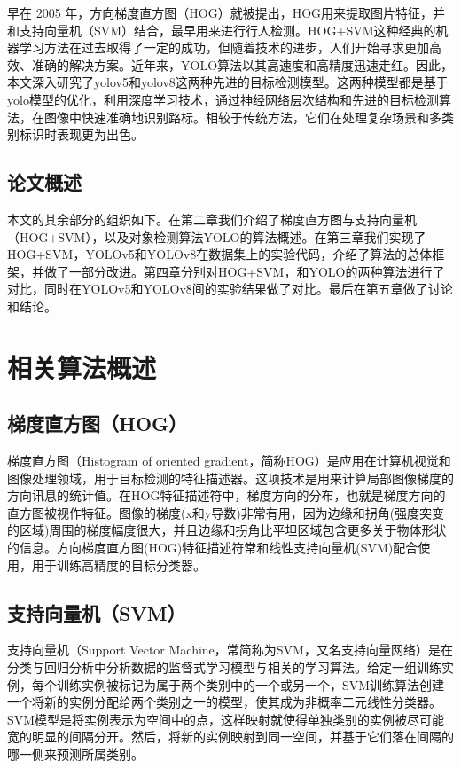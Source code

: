 \documentclass{article}
\begin{document}
早在 2005 年，方向梯度直方图（HOG）就被提出，HOG用来提取图片特征，并和支持向量机（SVM）结合，最早用来进行行人检测。HOG+SVM这种经典的机器学习方法在过去取得了一定的成功，但随着技术的进步，人们开始寻求更加高效、准确的解决方案。近年来，YOLO算法以其高速度和高精度迅速走红。因此，本文深入研究了yolov5和yolov8这两种先进的目标检测模型。这两种模型都是基于yolo模型的优化，利用深度学习技术，通过神经网络层次结构和先进的目标检测算法，在图像中快速准确地识别路标。相较于传统方法，它们在处理复杂场景和多类别标识时表现更为出色。

\subsection{论文概述}
本文的其余部分的组织如下。在第二章我们介绍了梯度直方图与支持向量机（HOG+SVM），以及对象检测算法YOLO的算法概述。在第三章我们实现了HOG+SVM，YOLOv5和YOLOv8在数据集上的实验代码，介绍了算法的总体框架，并做了一部分改进。第四章分别对HOG+SVM，和YOLO的两种算法进行了对比，同时在YOLOv5和YOLOv8间的实验结果做了对比。最后在第五章做了讨论和结论。

\section{相关算法概述}
\subsection{梯度直方图（HOG）}
梯度直方图（Histogram of oriented gradient，简称HOG）\cite{1467360}是应用在计算机视觉和图像处理领域，用于目标检测的特征描述器。这项技术是用来计算局部图像梯度的方向讯息的统计值。在HOG特征描述符中，梯度方向的分布，也就是梯度方向的直方图被视作特征。图像的梯度(x和y导数)非常有用，因为边缘和拐角(强度突变的区域)周围的梯度幅度很大，并且边缘和拐角比平坦区域包含更多关于物体形状的信息。方向梯度直方图(HOG)特征描述符常和线性支持向量机(SVM)配合使用，用于训练高精度的目标分类器。

\subsection{支持向量机（SVM）}
支持向量机（Support Vector Machine，常简称为SVM，又名支持向量网络）\cite{708428}是在分类与回归分析中分析数据的监督式学习模型与相关的学习算法。给定一组训练实例，每个训练实例被标记为属于两个类别中的一个或另一个，SVM训练算法创建一个将新的实例分配给两个类别之一的模型，使其成为非概率二元线性分类器。SVM模型是将实例表示为空间中的点，这样映射就使得单独类别的实例被尽可能宽的明显的间隔分开。然后，将新的实例映射到同一空间，并基于它们落在间隔的哪一侧来预测所属类别。
\end{document}
